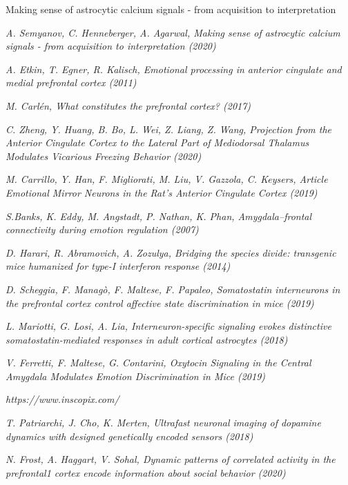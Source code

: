 Making sense of astrocytic calcium signals - from acquisition to interpretation 


\begin{thebibliography}{50}
	\textit{A. Semyanov, C. Henneberger, A. Agarwal, Making sense of astrocytic calcium signals - from acquisition to interpretation (2020)}
	
	\textit{A. Etkin, T. Egner, R. Kalisch, Emotional processing in anterior
		cingulate and medial prefrontal cortex (2011)}
	
	\textit{M. Carlén, What constitutes the prefrontal cortex?  (2017)}
	
	\textit{C. Zheng, Y. Huang, B. Bo, L. Wei, Z. Liang, Z. Wang, Projection from the Anterior Cingulate Cortex to the Lateral Part of Mediodorsal Thalamus Modulates Vicarious Freezing Behavior  (2020)}
	
	\textit{M. Carrillo, Y. Han,
		F. Migliorati, M. Liu,
		V. Gazzola, C. Keysers, Article
		Emotional Mirror Neurons in the Rat’s Anterior
		Cingulate Cortex (2019)}
	
	\textit{S.Banks, K. Eddy, M. Angstadt, P. Nathan, K. Phan, Amygdala–frontal connectivity during emotion regulation (2007)}
	
	\textit{D. Harari, R. Abramovich, A. Zozulya, Bridging the species divide: transgenic mice humanized for type-I interferon response  (2014)}
	
	\textit{D. Scheggia, F. Managò, F. Maltese, F. Papaleo, Somatostatin interneurons in the prefrontal cortex
		control affective state discrimination in mice (2019)}
	
	\textit{L. Mariotti, G. Losi, A. Lia, Interneuron-specific signaling evokes distinctive
		somatostatin-mediated responses in adult cortical
		astrocytes (2018)}
	
	\textit{V. Ferretti, F. Maltese,
		G. Contarini, Oxytocin Signaling in the Central Amygdala
		Modulates Emotion Discrimination in Mice (2019)}
	
	\textit{https://www.inscopix.com/}
	
	\textit{T. Patriarchi, J. Cho, K. Merten, Ultrafast neuronal imaging of dopamine dynamics with designed genetically encoded sensors (2018)}
	
	\textit{
		N. Frost, A. Haggart, V. Sohal,
		Dynamic patterns of correlated activity in the prefrontal1
		cortex encode information about social behavior (2020)}
	

\end{thebibliography}
